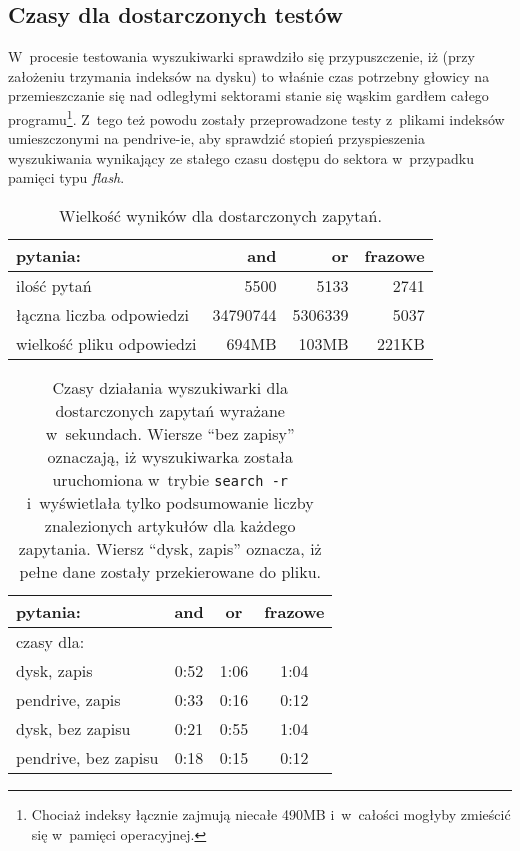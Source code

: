 \documentclass[a4paper,12pt]{article}
\begin{document}
\subsection{Czasy dla dostarczonych testów}

W~procesie testowania wyszukiwarki sprawdziło się przypuszczenie, iż (przy
założeniu trzymania indeksów na dysku) to właśnie czas potrzebny głowicy na
przemieszczanie się nad odległymi sektorami stanie się wąskim gardłem
całego programu\footnote{Chociaż indeksy łącznie zajmują niecałe 490MB
i~w~całości mogłyby zmieścić się w~pamięci operacyjnej.}. Z~tego też powodu
zostały przeprowadzone testy z~plikami indeksów umieszczonymi na pendrive-ie,
aby sprawdzić stopień przyspieszenia wyszukiwania wynikający ze stałego czasu
dostępu do sektora w~przypadku pamięci typu \textit{flash}.

\begin{center}
	\begin{table}
		\begin{tabular}[c]{| l || r | r | r |}
		\hline
		pytania: & and & or & frazowe \\ \hline \hline
		ilość pytań & 5500 & 5133 & 2741 \\ \hline
		łączna liczba odpowiedzi & 34790744 & 5306339 & 5037 \\ \hline
		wielkość pliku odpowiedzi & 694MB & 103MB & 221KB \\
		\hline
		\end{tabular}
		\caption{Wielkość wyników dla dostarczonych zapytań.}
	\end{table}
\end{center}

\begin{center}
	\begin{table}
		\begin{tabular}[c]{| l || c | c | c |}
		\hline
		pytania: & and & or & frazowe \\ \hline \hline
		czasy dla: & \multicolumn{3}{|l|}{} \\ \hline
		dysk, zapis & 0:52 & 1:06 & 1:04 \\ \hline
		pendrive, zapis & 0:33 & 0:16 & 0:12 \\ \hline
		dysk, bez zapisu & 0:21 & 0:55 & 1:04 \\ \hline
		pendrive, bez zapisu & 0:18 & 0:15 & 0:12 \\
		\hline
		\end{tabular}
		\caption{Czasy działania wyszukiwarki dla dostarczonych zapytań
		wyrażane w~sekundach.  Wiersze ``bez zapisy'' oznaczają, iż
		wyszukiwarka została uruchomiona w~trybie \texttt{search -r}
		i~wyświetlała tylko podsumowanie liczby znalezionych artykułów dla
		każdego zapytania. Wiersz ``dysk, zapis'' oznacza, iż pełne dane
		zostały przekierowane do pliku.}
	\end{table}
\end{center}
\end{document}
